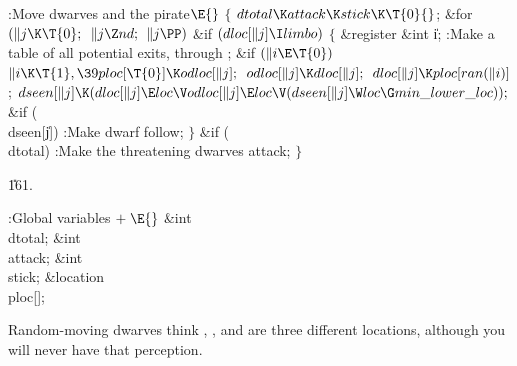 \Y\B\4:Move dwarves and the pirate\X${}\E{}$\6
${}\{{}$\1\6
${}\\{dtotal}\K\\{attack}\K\\{stick}\K\T{0}{}$;\6
\&{for} ${}(\|j\K\T{0};{}$ ${}\|j\Z\\{nd};{}$ ${}\|j\PP){}$\1\6
\&{if} ${}(\\{dloc}[\|j]\I\\{limbo}){}$\5
${}\{{}$\1\6
\&{register} \&{int} \|i;\7
:Make a table of all potential exits,  through \X;\6
\&{if} ${}(\|i\E\T{0}){}$\1\5
${}\|i\K\T{1},\39\\{ploc}[\T{0}]\K\\{odloc}[\|j];{}$\2\6
${}\\{odloc}[\|j]\K\\{dloc}[\|j];{}$\6
${}\\{dloc}[\|j]\K\\{ploc}[\\{ran}(\|i)]{}$;\6
${}\\{dseen}[\|j]\K(\\{dloc}[\|j]\E\\{loc}\V\\{odloc}[\|j]\E\\{loc}\V(\\{dseen}[\|j]\W\\{loc}\G\\{min\_lower\_loc}));{}$\6
\&{if} (\\{dseen}[\|j])\1\5
:Make dwarf  follow\X;\2\6
\4${}\}{}$\2\2\6
\&{if} (\\{dtotal})\1\5
:Make the threatening dwarves attack\X;\2\6
\4${}\}{}$\2\par
\U161.\fi

\B{}:Global variables\X${}\mathrel+\E{}$\6
\&{int} \\{dtotal};\6
\&{int} \\{attack};\6
\&{int} \\{stick};\6
\&{location} \\{ploc}[];\par
\fi

Random-moving dwarves think , , and  are three different
locations, although you will never have that perception.

